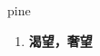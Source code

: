 
\begin{frame}
{\huge pine}
\begin{center}
\begin{enumerate}\Large
  \item \textbf{渴望，奢望}
\end{enumerate}
\end{center}
\end{frame}
